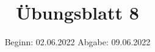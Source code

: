 

\title{Übungsblatt 8}
\date{%
  Beginn: 02.06.2022
  \hspace{3em}
  Abgabe: 09.06.2022
}



\maketitle
\thispagestyle{empty}
\tableofcontents
\newpage






